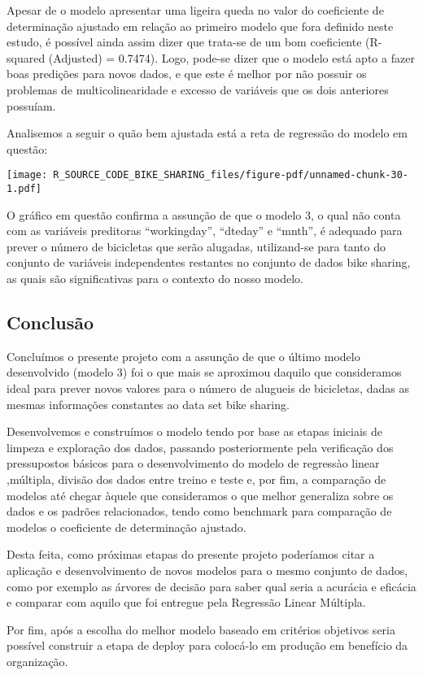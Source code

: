 \documentclass[
  letterpaper,
  DIV=11,
  numbers=noendperiod]{scrartcl}
\begin{document}
Apesar de o modelo apresentar uma ligeira queda no valor do coeficiente
de determinação ajustado em relação ao primeiro modelo que fora definido
neste estudo, é possível ainda assim dizer que trata-se de um bom
coeficiente (R-squared (Adjusted) = 0.7474). Logo, pode-se dizer que o
modelo está apto a fazer boas predições para novos dados, e que este é
melhor por não possuir os problemas de multicolinearidade e excesso de
variáveis que os dois anteriores possuíam.

Analisemos a seguir o quão bem ajustada está a reta de regressão do
modelo em questão:

\begin{center}
\texttt{[image: R\_SOURCE\_CODE\_BIKE\_SHARING\_files/figure-pdf/unnamed-chunk-30-1.pdf]}
\end{center}

O gráfico em questão confirma a assunção de que o modelo 3, o qual não
conta com as variáveis preditoras ``workingday'', ``dteday'' e ``mnth'',
é adequado para prever o número de bicicletas que serão alugadas,
utilizand-se para tanto do conjunto de variáveis independentes restantes
no conjunto de dados bike sharing, as quais são significativas para o
contexto do nosso modelo.

\subsection{Conclusão}\label{conclusuxe3o}

Concluímos o presente projeto com a assunção de que o último modelo
desenvolvido (modelo 3) foi o que mais se aproximou daquilo que
consideramos ideal para prever novos valores para o número de alugueis
de bicicletas, dadas as mesmas informações constantes ao data set bike
sharing.

Desenvolvemos e construímos o modelo tendo por base as etapas iniciais
de limpeza e exploração dos dados, passando posteriormente pela
verificação dos pressupostos básicos para o desenvolvimento do modelo de
regressào linear ,múltipla, divisão dos dados entre treino e teste e,
por fim, a comparação de modelos até chegar àquele que consideramos o
que melhor generaliza sobre os dados e os padrões relacionados, tendo
como benchmark para comparação de modelos o coeficiente de determinação
ajustado.

Desta feita, como próximas etapas do presente projeto poderíamos citar a
aplicação e desenvolvimento de novos modelos para o mesmo conjunto de
dados, como por exemplo as árvores de decisão para saber qual seria a
acurácia e eficácia e comparar com aquilo que foi entregue pela
Regressão Linear Múltipla.

Por fim, após a escolha do melhor modelo baseado em critérios objetivos
seria possível construir a etapa de deploy para colocá-lo em produção em
benefício da organização.
\end{document}
